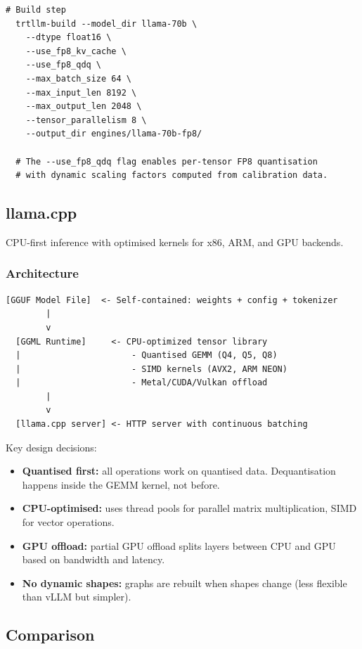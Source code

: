 \documentclass[11pt,a4paper]{article}
\theoremstyle{definition}
\begin{document}
\begin{lstlisting}[caption=Building an FP8 TensorRT-LLM engine]
  # Build step
  trtllm-build --model_dir llama-70b \
    --dtype float16 \
    --use_fp8_kv_cache \
    --use_fp8_qdq \
    --max_batch_size 64 \
    --max_input_len 8192 \
    --max_output_len 2048 \
    --tensor_parallelism 8 \
    --output_dir engines/llama-70b-fp8/

  # The --use_fp8_qdq flag enables per-tensor FP8 quantisation
  # with dynamic scaling factors computed from calibration data.
\end{lstlisting}

\subsection{llama.cpp}

CPU-first inference with optimised kernels for x86, ARM, and GPU backends.

\subsubsection{Architecture}

\begin{lstlisting}[caption=llama.cpp serving stack]
  [GGUF Model File]  <- Self-contained: weights + config + tokenizer
        |
        v
  [GGML Runtime]     <- CPU-optimized tensor library
  |                      - Quantised GEMM (Q4, Q5, Q8)
  |                      - SIMD kernels (AVX2, ARM NEON)
  |                      - Metal/CUDA/Vulkan offload
        |
        v
  [llama.cpp server] <- HTTP server with continuous batching
\end{lstlisting}

Key design decisions:
\begin{itemize}
	\item \textbf{Quantised first:} all operations work on quantised data. Dequantisation happens inside the GEMM kernel, not before.
	\item \textbf{CPU-optimised:} uses thread pools for parallel matrix multiplication, SIMD for vector operations.
	\item \textbf{GPU offload:} partial GPU offload splits layers between CPU and GPU based on bandwidth and latency.
	\item \textbf{No dynamic shapes:} graphs are rebuilt when shapes change (less flexible than vLLM but simpler).
\end{itemize}

\subsection{Comparison}
\end{document}
